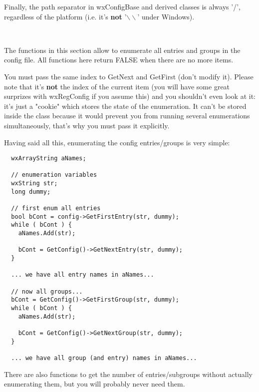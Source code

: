 Finally, the path separator in wxConfigBase and derived classes is always '/',
regardless of the platform (i.e. it's {\bf not} '$\backslash\backslash$' under Windows).

\\


The functions in this section allow to enumerate all entries and groups in the
config file. All functions here return FALSE when there are no more items.

You must pass the same index to GetNext and GetFirst (don't modify it).
Please note that it's {\bf not} the index of the current item (you will have
some great surprizes with wxRegConfig if you assume this) and you shouldn't
even look at it: it's just a "cookie" which stores the state of the
enumeration. It can't be stored inside the class because it would prevent you
from running several enumerations simultaneously, that's why you must pass it
explicitly.

Having said all this, enumerating the config entries/groups is very simple:

\begin{verbatim}
  wxArrayString aNames;

  // enumeration variables
  wxString str;
  long dummy;

  // first enum all entries
  bool bCont = config->GetFirstEntry(str, dummy);
  while ( bCont ) {
    aNames.Add(str);

    bCont = GetConfig()->GetNextEntry(str, dummy);
  }

  ... we have all entry names in aNames...

  // now all groups...
  bCont = GetConfig()->GetFirstGroup(str, dummy);
  while ( bCont ) {
    aNames.Add(str);

    bCont = GetConfig()->GetNextGroup(str, dummy);
  }

  ... we have all group (and entry) names in aNames...

\end{verbatim}

There are also functions to get the number of entries/subgroups without
actually enumerating them, but you will probably never need them.

\\
\\
\\
\\
\\

